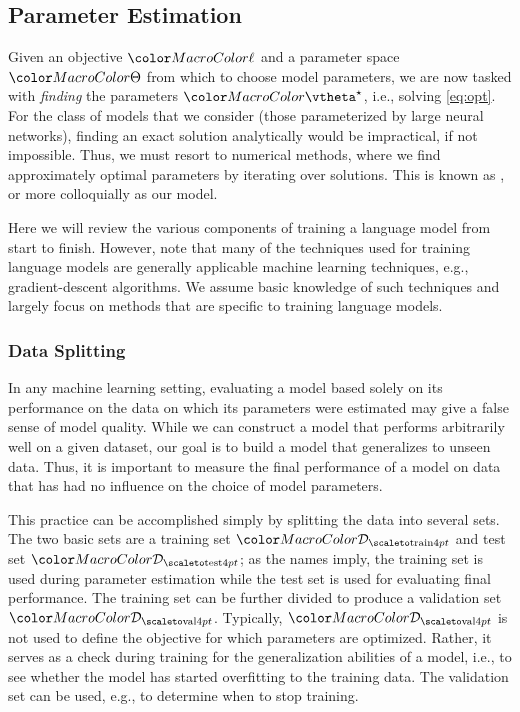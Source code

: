 \subsection{Parameter Estimation}
Given an objective $\loss$ and a parameter space $\paramspace$ from which to choose model parameters, we are now tasked with \emph{finding} the parameters $\modelparams^\star$, i.e., solving \cref{eq:opt}. For the class of models that we consider (those parameterized by large neural networks), finding an exact solution analytically would be impractical, if not impossible. Thus, we must resort to numerical methods, where we find approximately optimal parameters by iterating over solutions. This is known as , or more colloquially as  our model.   

Here we will review the various components of training a language model from start to finish. However, note that many of the techniques used for training language models are generally applicable machine learning techniques, e.g., gradient-descent algorithms. We assume basic knowledge of such techniques and largely focus on methods that are specific to training language models.


\subsubsection{Data Splitting}
In any machine learning setting, evaluating a model based solely on its performance on the data on which its parameters were estimated may give a false sense of model quality. While we can construct a model that performs arbitrarily well on a given dataset, our goal is to build a model that generalizes to unseen data.  Thus, it is important to measure the final performance of a model on data  that has had no influence on the choice of model parameters. 

This practice can be accomplished simply by splitting the data into several sets. The two basic sets are a training set $\corpustrain$ and test set $\corpustest$; as the names imply, the training set is used during parameter estimation while the test set is used for evaluating final performance. The training set can be further divided to produce a validation set $\corpusval$. Typically, $\corpusval$ is not used to define the objective for which parameters are optimized. Rather, it serves as a check during training for the generalization abilities of a model, i.e., to see whether the model has started overfitting to the training data. The validation set can be used, e.g., to determine when to stop training.

